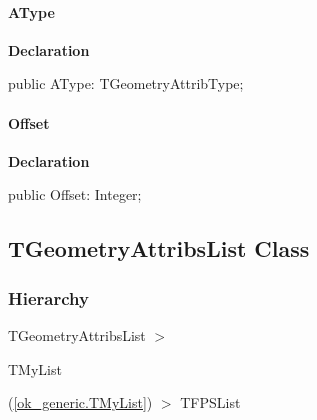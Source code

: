 \documentclass{report}
\begin{document}
\paragraph*{AType}\hspace*{\fill}

\begin{list}{}{
\setlength{\itemindent}{0cm}
\setlength{\listparindent}{0cm}
\setlength{\leftmargin}{\evensidemargin}
\addtolength{\leftmargin}{\tmplength}
\settowidth{\labelsep}{X}
\addtolength{\leftmargin}{\labelsep}
\setlength{\labelwidth}{\tmplength}
}
\begin{flushleft}
\item[\textbf{Declaration}\hfill]
\begin{ttfamily}
public AType: TGeometryAttribType;\end{ttfamily}


\end{flushleft}
\end{list}
\paragraph*{Offset}\hspace*{\fill}

\begin{list}{}{
\setlength{\itemindent}{0cm}
\setlength{\listparindent}{0cm}
\setlength{\leftmargin}{\evensidemargin}
\addtolength{\leftmargin}{\tmplength}
\settowidth{\labelsep}{X}
\addtolength{\leftmargin}{\labelsep}
\setlength{\labelwidth}{\tmplength}
}
\begin{flushleft}
\item[\textbf{Declaration}\hfill]
\begin{ttfamily}
public Offset: Integer;\end{ttfamily}


\end{flushleft}
\end{list}
\subsection*{TGeometryAttribsList Class}
\subsubsection*{\large{\textbf{Hierarchy}}\normalsize\hspace{1ex}\hfill}
TGeometryAttribsList {$>$} \begin{ttfamily}TMyList\end{ttfamily}(\ref{ok_generic.TMyList}) {$>$} 
TFPSList
\end{document}
